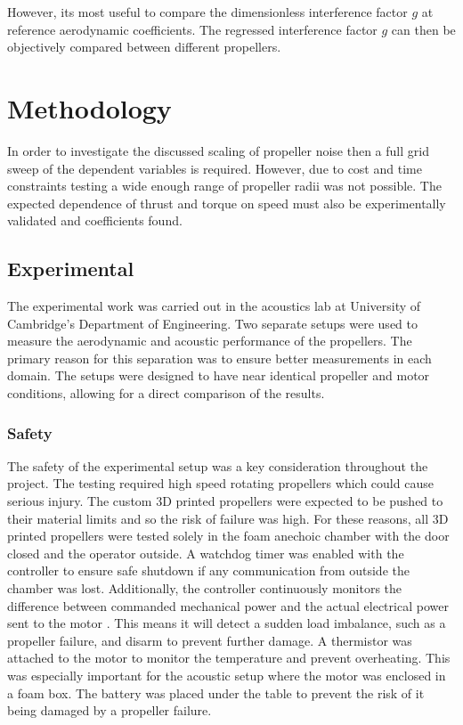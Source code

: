 \documentclass[12pt,a4paper]{article}
\begin{document}
However, its most useful to compare the dimensionless interference factor $g$ at reference aerodynamic coefficients.
The regressed interference factor $g$ can then be objectively compared between different propellers.

\section{Methodology}


In order to investigate the discussed scaling of propeller noise then a full grid sweep of the dependent variables is required.
However, due to cost and time constraints testing a wide enough range of propeller radii was not possible.
The expected dependence of thrust and torque on speed must also be experimentally validated and coefficients found.

\subsection{Experimental}
The experimental work was carried out in the acoustics lab at University of Cambridge's Department of Engineering.
Two separate setups were used to measure the aerodynamic and acoustic performance of the propellers.
The primary reason for this separation was to ensure better measurements in each domain.
The setups were designed to have near identical propeller and motor conditions, allowing for a direct comparison of the results.

\subsubsection{Safety}
The safety of the experimental setup was a key consideration throughout the project.
The testing required high speed rotating propellers which could cause serious injury.
The custom 3D printed propellers were expected to be pushed to their material limits and so the risk of failure was high.
For these reasons, all 3D printed propellers were tested solely in the foam anechoic chamber with the door closed and the operator outside.
A watchdog timer was enabled with the controller to ensure safe shutdown if any communication from outside the chamber was lost.
Additionally, the controller continuously monitors the difference between commanded mechanical power and the actual electrical power sent to the motor \cite{odrive_doc}.
This means it will detect a sudden load imbalance, such as a propeller failure, and disarm to prevent further damage.
A thermistor was attached to the motor to monitor the temperature and prevent overheating.
This was especially important for the acoustic setup where the motor was enclosed in a foam box.
The battery was placed under the table to prevent the risk of it being damaged by a propeller failure.
\end{document}
